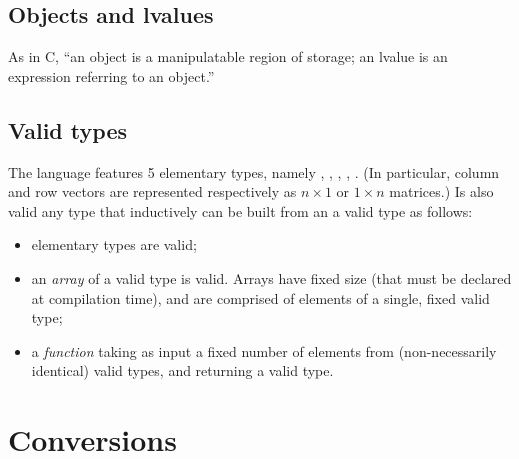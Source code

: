 \subsection{Objects and lvalues}
As in C, ``an object is a manipulatable region of storage; an lvalue is an expression referring to an object.''

\subsection{Valid types}

The language features 5 elementary types, namely \integ, \float, \complex, \qubit, \mat. (In particular, column and row vectors are represented respectively as $n\times1$ or $1\times n$ matrices.) Is also valid any type that inductively can be built from an a valid type as follows:
\begin{itemize}
  \item elementary types are valid;
  \item an \emph{array} of a valid type is valid. Arrays have fixed size (that must be declared at compilation time), and are comprised of elements of a single, fixed valid type;
  \item a \emph{function} taking as input a fixed number of elements from (non-necessarily identical) valid types, and returning a valid type.
\end{itemize}

\section{Conversions}

